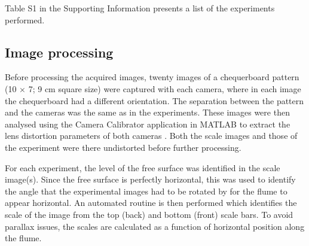 \documentclass[authoryear,preprint,review,12pt]{elsarticle}
\begin{document}
Table S1 in the Supporting Information presents a list of the experiments performed.


\subsection{Image processing}
\label{subsec:im_process}

Before processing the acquired images, twenty images of a chequerboard pattern (10 $\times$ 7; 9 cm square size) were captured with each camera, where in each image the chequerboard had a different orientation. The separation between the pattern and the cameras was the same as in the experiments. These images were then analysed using the Camera Calibrator application in MATLAB to extract the lens distortion parameters of both cameras \citep{Zhang00}. Both the scale images and those of the experiment were there undistorted before further processing.

For each experiment, the level of the free surface was identified in the scale image(s). Since the free surface is perfectly horizontal, this was used to identify the angle that the experimental images had to be rotated by for the flume to appear horizontal. An automated routine is then performed which identifies the scale of the image from the top (back) and bottom (front) scale bars. To avoid parallax issues, the scales are calculated as a function of horizontal position along the flume. 
\end{document}
